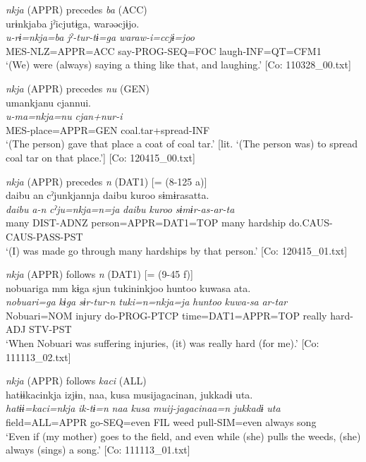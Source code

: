   \ex  \textit{nkja} (APPR) precedes \textit{ba} (ACC)\\
      \glll    urɨnkjaba  jˀicjutɨga,  warəəcjɨjo.\\
      \textit{u-rɨ=nkja=ba}  \textit{jˀ-tur-tɨ=ga}  \textit{waraw-i=ccjɨ=joo}\\
      MES-NLZ=APPR=ACC  say-PROG-SEQ=FOC  laugh-INF=QT=CFM1\\
      \glt       ‘(We) were (always) saying a thing like that, and laughing.’ [Co: 110328\_00.txt]

  \ex  \textit{nkja} (APPR) precedes \textit{nu} (GEN)\\

      \glll    umankjanu  cjannui.\\
      \textit{u-ma=nkja=nu}  \textit{cjan+nur-i}\\
      MES-place=APPR=GEN  coal.tar+spread-INF\\
    \glt   ‘(The person) gave that place a coat of coal tar.’ [lit. ‘(The person was) to spread coal tar on that place.’]      [Co: 120415\_00.txt]

  \ex  \textit{nkja} (APPR) precedes \textit{n} (DAT1) [= (8-125 a)]\\
      \glll    {\textbar}daibu{\textbar}  an  cˀjunkjannja  {\textbar}daibu  kuroo{\textbar}  sɨmɨrasatta.\\
      \textit{daibu}  \textit{a-n}  \textit{cˀju=nkja=n=ja}  \textit{daibu}  \textit{kuroo} \textit{sɨmɨr-as-ar-ta}\\
      many  DIST-ADNZ  person=APPR=DAT1=TOP  many  hardship   do.CAUS-CAUS-PASS-PST\\
      \glt       ‘(I) was made go through many hardships by that person.’ [Co: 120415\_01.txt]

  \ex \textit{nkja} (APPR) follows \textit{n} (DAT1) [= (9-45 f)]\\
      \glll    nobuariga  mm  kɨga  sjun  tukininkjoo  huntoo  kuwasa  ata.\\
      \textit{nobuari=ga}    \textit{kɨga}  \textit{sɨr-tur-n}  \textit{tuki=n=nkja=ja}  \textit{huntoo}  \textit{kuwa-sa}  \textit{ar-tar}\\
      Nobuari=NOM    injury  do-PROG-PTCP  time=DAT1=APPR=TOP  really  hard-ADJ  STV-PST\\
      \glt       ‘When Nobuari was suffering injuries, (it) was really hard (for me).’ [Co: 111113\_02.txt]

   \ex  \textit{nkja} (APPR) follows \textit{kaci} (ALL)\\
      \glll    hatɨɨkacinkja  izjɨn,  naa,  kusa  musijagacinan,  jukkadɨ  uta.      \\
      \textit{hatɨɨ=kaci=nkja}  \textit{ik-tɨ=n}  \textit{naa}  \textit{kusa}  \textit{muij-jagacinaa=n}  \textit{jukkadɨ}  \textit{uta}      \\
      field=ALL=APPR  go-SEQ=even  FIL  weed  pull-SIM=even  always  song\\
      \glt       ‘Even if (my mother) goes to the field, and even while (she) pulls the weeds, (she) always (sings) a song.’ [Co: 111113\_01.txt]

